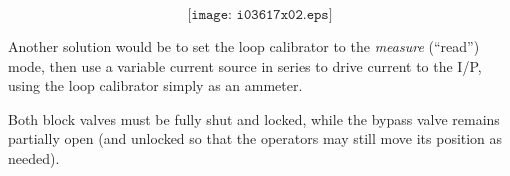 $$\texttt{[image: i03617x02.eps]}$$

Another solution would be to set the loop calibrator to the {\it measure} (``read'') mode, then use a variable current source in series to drive current to the I/P, using the loop calibrator simply as an ammeter.

\vskip 10pt

Both block valves must be fully shut and locked, while the bypass valve remains partially open (and unlocked so that the operators may still move its position as needed).




